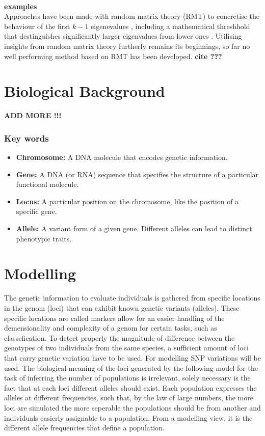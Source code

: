 \documentclass[a4paper, 11pt]{article}
\begin{document}
\\
\textbf{examples}
\\
Approaches have been made with random matrix theory (RMT) to concretise the behaviour of the first $k-1$ eigenevalues \cite{patterson2006population}, including a mathematical threshhold that destinguishes significantly larger eigenvalues from lower ones \cite {bryc2013separation}. Utilising insights from random matrix theory furtherly remains its beginnings, so far no well performing method based on RMT has been developed. \textbf{cite ???}


\section{Biological Background}

\textbf{ADD MORE !!!}

\subsubsection{Key words}

\begin{itemize}
\item \textbf{Chromosome:} A DNA molecule that encodes genetic information.

\item \textbf{Gene:} A DNA (or RNA) sequence that specifies the structure of a particular functional molecule.

\item \textbf{Locus:} A particular position on the chromosome, like the position of a specific gene.

\item \textbf{Allele:} A variant form of a given gene. Different alleles can lead to distinct phenotypic traits.

\end{itemize}

\section{Modelling}

The genetic information to evaluate individuals is gathered from specific locations in the genom (loci) that can exhibit known genetic variants (alleles). These specific locations are called markers allow for an easier handling of the demensionality and complexity of a genom for certain tasks, such as classefication. To detect properly the magnitude of difference between the genotypes of two individuals from the same species, a sufficient amount of loci that carry genetic variation have to be used. For modelling SNP variations will be used. The biological meaning of the loci generated by the following model for the task of inferring the number of populations is irrelevant, solely necessary is the fact that at each loci different alleles should exist. Each population expresses the alleles at different frequencies, such that, by the law of large numbers, the more loci are simulated the more seperable the populations should be from another and individuals easierly assignable to a population. From a modelling view, it is the different allele frequencies that define a population. \\
\end{document}
